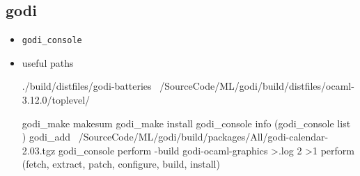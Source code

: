 
\subsection{godi}
\label{sec:godi}
\begin{itemize}
\item \verb|godi_console |

  \item useful paths \\
    

\begin{bluecode}
./build/distfiles/godi-batteries
~/SourceCode/ML/godi/build/distfiles/ocaml-3.12.0/toplevel/
\end{bluecode}





\begin{bluecode}
godi_make makesum
godi_make  install
godi_console info (godi_console list )
godi_add ~/SourceCode/ML/godi/build/packages/All/godi-calendar-2.03.tgz
godi_console perform -build godi-ocaml-graphics  >.log 2 >1
perform (fetch, extract, patch, configure, build, install)
\end{bluecode}

  
\end{itemize}


